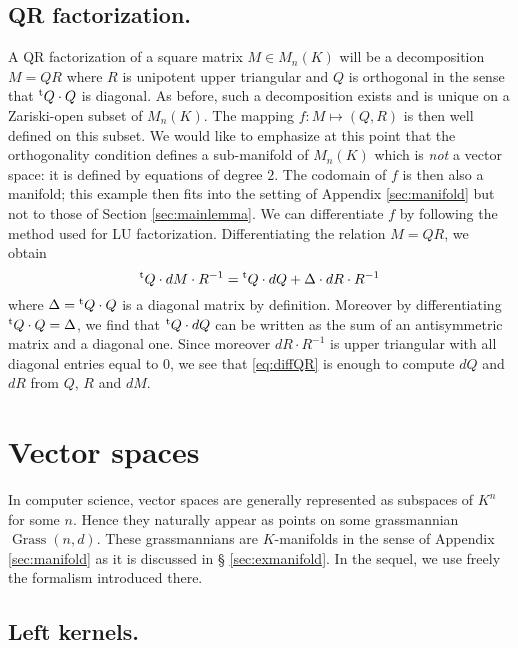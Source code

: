 \documentclass{sig-alternate}
\DeclareMathOperator{\Grass}{Grass}
\begin{document}
{\subsection*{QR factorization.}

A QR factorization of a square matrix $M \in M_n(K)$ will be
a decomposition $M = QR$ where $R$ is unipotent upper triangular and $Q$ is
orthogonal in the sense that ${}^{\text t} Q \cdot Q$ is diagonal. As before, such 
a decomposition exists and is unique on a Zariski-open subset of $M_n(K)$. The
mapping $f : M \mapsto (Q,R)$ is then well defined on this subset. We 
would like to emphasize at this point that the orthogonality condition
defines a sub-manifold of $M_n(K)$ which is \emph{not} a
vector space: it is defined by equations of degree $2$. The codomain
of $f$ is then also a manifold; this example then fits into the setting
of Appendix \ref{sec:manifold} but not to those of Section \ref{sec:mainlemma}. 
We can differentiate $f$ by following the method used for LU 
factorization.  Differentiating the relation $M = QR$, we obtain
\begin{equation}
\label{eq:diffQR}
{}^{\text t} Q \cdot dM \cdot R^{-1} = {}^{\text t} Q \cdot dQ + \Delta \cdot dR 
\cdot R^{-1}
\end{equation}
where $\Delta = {}^{\text t} Q \cdot Q$ is a diagonal matrix by definition.
Moreover by differentiating ${}^{\text t} Q \cdot Q = \Delta$, we find that
${}^{\text t} Q \cdot dQ$ can be written as the sum of an antisymmetric 
matrix and a diagonal one. Since moreover $dR \cdot R^{-1}$ is upper
triangular with all diagonal entries equal to $0$, we see that 
\eqref{eq:diffQR} is enough to compute $dQ$ and $dR$ from $Q$, $R$ 
and $dM$.

\section{Vector spaces}

In computer science, vector spaces are generally represented as subspaces 
of $K^n$ for some $n$. Hence they naturally appear as points on some 
grassmannian $\Grass(n,d)$. These grassmannians are $K$-manifolds in the 
sense of Appendix \ref{sec:manifold} as it is discussed in \S 
\ref{sec:exmanifold}. In the sequel, we use freely the formalism 
introduced there.

\subsection*{Left kernels.}

}
\end{document}
